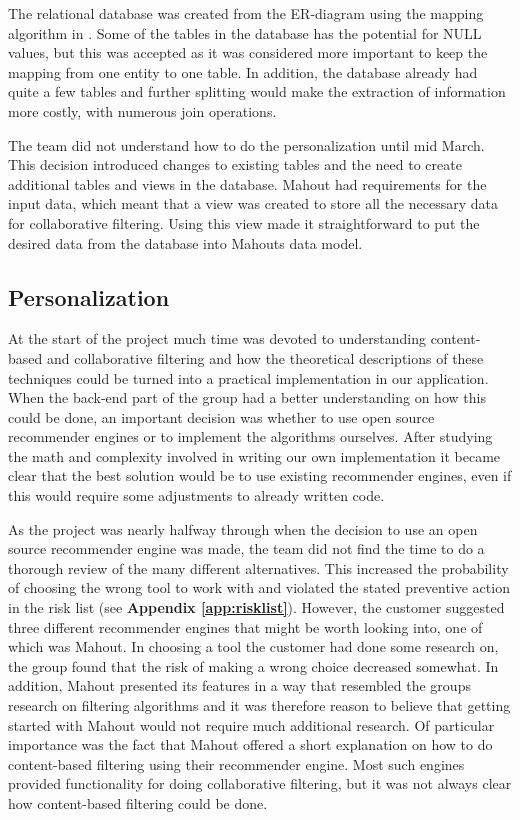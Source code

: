 The relational database was created from the ER-diagram using the mapping algorithm in \cite[p.270-278]{AS2}. Some of the tables in the database has the potential for NULL values, but this was accepted as it was considered more important to keep the mapping from one entity to one table. In addition, the database already had quite a few tables and further splitting would make the extraction of information more costly, with numerous join operations. \newline 

The team did not understand how to do the personalization until mid March. This decision introduced changes to existing tables and the need to create additional tables and views in the database. Mahout had requirements for the input data, which meant that a view was created to store all the necessary data for collaborative filtering. Using this view made it straightforward to put the desired data from the database into Mahouts data model.

\subsection{Personalization}

At the start of the project much time was devoted to understanding content-based and collaborative filtering and how the theoretical descriptions of these techniques could be turned into a practical implementation in our application. When the back-end part of the group had a better understanding on how this could be done, an important decision was whether to use open source recommender engines or to implement the algorithms ourselves. After studying the math and complexity involved in writing our own implementation it became clear that the best solution would be to use existing recommender engines, even if this would require some adjustments to already written code. \newline

As the project was nearly halfway through when the decision to use an open source recommender engine was made, the team did not find the time to do a thorough review of the many different alternatives. This increased the probability of choosing the wrong tool to work with and violated the stated preventive action in the risk list (see \textbf{Appendix \ref{app:risklist}}). However, the customer suggested three different recommender engines that might be worth looking into, one of which was Mahout. In choosing a tool the customer had done some research on, the group found that the risk of making a wrong choice decreased somewhat. In addition, Mahout presented its features in a way that resembled the groups research on filtering algorithms and it was therefore reason to believe that getting started with Mahout would not require much additional research. Of particular importance was the fact that Mahout offered a short explanation on how to do content-based filtering using their recommender engine. Most such engines provided functionality for doing collaborative filtering, but it was not always clear how content-based filtering could be done.\newline


